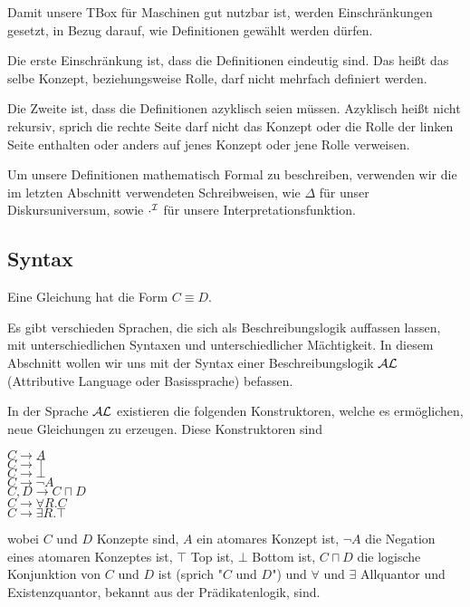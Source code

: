 \documentclass[runningheads,a4paper]{llncs}
\begin{document}
Damit unsere TBox für Maschinen gut nutzbar ist, werden Einschränkungen gesetzt, in Bezug darauf, wie Definitionen gewählt werden dürfen.

Die erste Einschränkung ist, dass die Definitionen eindeutig sind. Das heißt das selbe Konzept, beziehungsweise Rolle, darf nicht mehrfach definiert werden.

Die Zweite ist, dass die Definitionen azyklisch seien müssen. Azyklisch heißt nicht rekursiv, sprich die rechte Seite darf nicht das Konzept oder die Rolle der linken Seite enthalten oder anders auf jenes Konzept oder jene Rolle verweisen. 

Um unsere Definitionen mathematisch Formal zu beschreiben,  verwenden wir die im letzten Abschnitt verwendeten Schreibweisen, wie $\Delta$ für unser Diskursuniversum, sowie $\cdot^{\cal I}$ für unsere Interpretationsfunktion.



\subsection{Syntax}

Eine Gleichung hat die Form $C\equiv D$.

Es gibt verschieden Sprachen, die sich als Beschreibungslogik auffassen lassen, mit unterschiedlichen Syntaxen  und unterschiedlicher Mächtigkeit. In diesem Abschnitt wollen wir uns mit der Syntax einer Beschreibungslogik $\cal AL$ (Attributive Language oder Basissprache) befassen.

In der Sprache $\cal AL$ existieren die folgenden Konstruktoren, welche es ermöglichen, neue Gleichungen zu erzeugen. Diese Konstruktoren sind

	\begin{center}
	$C \rightarrow A $ \\
	$C\rightarrow\top $ \\
	$C \rightarrow\bot $ \\
	$C \rightarrow\neg A$ \\
	$C,D \rightarrow C\sqcap D$ \\
	$C \rightarrow\forall R.C$ \\
	$C \rightarrow\exists R.\top$ \\
	\end{center}

wobei $C$ und $D$ Konzepte sind, $A$ ein atomares Konzept ist, $\neg A$ die Negation eines atomaren Konzeptes ist, $\top$ Top ist, $\bot$ Bottom ist, $C\sqcap D$ die logische Konjunktion von $C$ und $D$ ist (sprich "$C$ und $D$") und $\forall$ und $\exists$  Allquantor und Existenzquantor, bekannt aus der Prädikatenlogik, sind.
\end{document}
